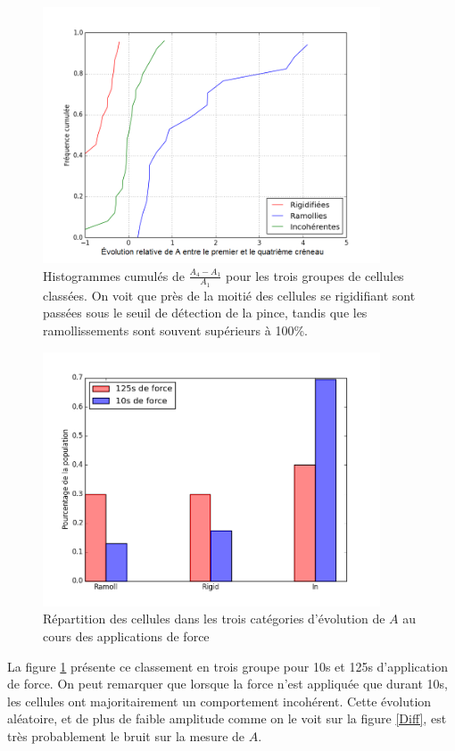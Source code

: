 \documentclass{report}
\begin{document}
\begin{figure}
\includegraphics[width=10cm]{Figures/Evolution_J4-J0_sur_J0.png} 
\caption{Histogrammes cumulés de $\frac{A_4-A_1}{A_1}$ pour les trois groupes de cellules classées. On voit que près de la moitié des cellules se rigidifiant sont passées sous le seuil de détection de la pince, tandis que les ramollissements sont souvent supérieurs à 100\%.  }
\end{figure}

\begin{figure}
\includegraphics[width=10cm]{Figures/FRI_temoin_vs_C4.png} 
\caption{Répartition des cellules dans les trois catégories d'évolution de $A$ au cours des applications de force \label{FRI_temoin}}
\end{figure}

La figure \ref{FRI_temoin} présente ce classement en trois groupe pour 10s et 125s d’application de force. On peut remarquer que lorsque la force n'est appliquée que durant 10s, les cellules ont majoritairement un comportement incohérent.
Cette évolution aléatoire, et de plus de faible amplitude comme on le voit sur la figure \ref{Diff}, est très probablement le bruit sur la mesure de $A$. 
\end{document}
